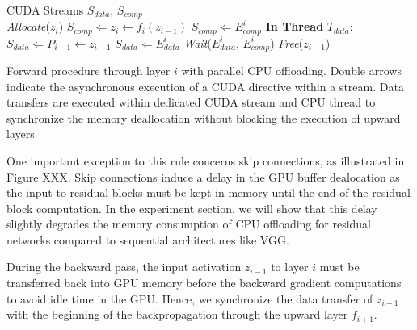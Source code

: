 \documentclass[11pt,onecolumn]{article}
\begin{document}
\begin{algorithm}[h]
	          \\ \hspace{1.1cm} CUDA Streams $S_{data}$, $S_{comp}$\\
\vspace{1mm}
\vspace{1mm}
    \textit{Allocate}($z_i$)\;
	$S_{comp} \Leftarrow z_i \leftarrow f_i(z_{i-1})$\;
	$S_{comp} \Leftarrow E_{comp}^i$\;
\vspace{1mm}
	\textbf{In Thread}  $T_{data}$:\\
		\hspace{1.1cm} 	$S_{data} \Leftarrow P_{i-1} \leftarrow z_{i-1}$\;
		\hspace{1.1cm}  $S_{data} \Leftarrow E_{data}^i$\;
		\hspace{1.1cm}  \textit{Wait}($E_{data}^i$, $E_{comp}^i$)\;
		\hspace{1.1cm}  \textit{Free}($z_{i-1}$)\;
	\caption{Forward procedure through layer $i$ with parallel CPU offloading. 
				 Double arrows indicate the asynchronous execution of a CUDA directive within a stream.
			     Data transfers are executed within dedicated CUDA stream and CPU thread to
		         synchronize the memory deallocation without blocking the execution of upward layers}
\end{algorithm}


One important exception to this rule concerns skip connections, as illustrated in Figure XXX.
Skip connections induce a delay in the GPU buffer dealocation as the input to residual blocks must
be kept in memory until the end of the residual block computation.
In the experiment section, we will show that this delay slightly degrades the memory consumption 
of CPU offloading for residual networks compared to sequential architectures like VGG.

During the backward pass, the input activation $z_{i-1}$ to layer $i$ must be transferred back into GPU memory
before the backward gradient computations to avoid idle time in the GPU.
Hence, we synchronize the data transfer of $z_{i-1}$ with the beginning of the backpropagation through 
the upward layer $f_{i+1}$.
\end{document}
